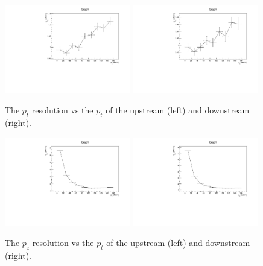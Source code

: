   \begin{figure}[p]
   \begin{center}
     \includegraphics[width=0.49\textwidth, angle=0]{08-Performance/downstream_pt_resolution_vs_pt.pdf}
     \includegraphics[width=0.49\textwidth, angle=0]{08-Performance/upstream_pt_resolution_vs_pt.pdf}
     \caption{\label{fig:PtPtResolKalman} The $p_t$ resolution vs the $p_t$ of the upstream (left) and downstream (right).}
   \end{center}
  \end{figure}
  
  \begin{figure}[p]
   \begin{center}
     \includegraphics[width=0.49\textwidth, angle=0]{08-Performance/downstream_pz_resolution_vs_pt.pdf}
     \includegraphics[width=0.49\textwidth, angle=0]{08-Performance/upstream_pz_resolution_vs_pt.pdf}
     \caption{\label{fig:PtPzResolKalman} The $p_z$ resolution vs the $p_t$ of the upstream (left) and downstream (right).}
   \end{center}
  \end{figure}